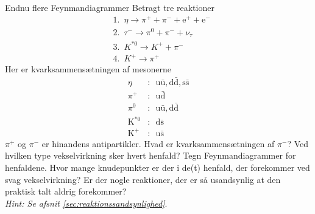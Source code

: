 \begin{opgave}{Endnu flere Feynmandiagrammer}
    Betragt tre reaktioner
    \begin{align*}
        &1. \enspace \eta \rightarrow \pi^+ + \pi^- + \mathrm{e}^+ + \mathrm{e}^- \\
        &2. \enspace \tau^- \rightarrow \pi^0 + \pi^- + \nu_\tau \\
        &3. \enspace K^{*0} \rightarrow K^+ + \pi^- \\
        &4. \enspace K^+ \rightarrow \pi^+
    \end{align*}
    Her er kvarksammensætningen af mesonerne
    \begin{align*}
        \eta&: \enspace \mathrm u \bar{\mathrm u}, \mathrm d \bar{\mathrm d}, \mathrm s \bar{\mathrm s} \\
        \pi^+&: \enspace \mathrm u \bar{\mathrm d} \\
        \pi^0&: \enspace \mathrm u \bar{\mathrm u}, \mathrm d \bar{\mathrm d} \\
        \mathrm K^{*0}&: \enspace \mathrm d \bar{\mathrm{s}} \\
        \mathrm K^+&: \enspace \mathrm u \bar{\mathrm{s}}
        \end{align*}
    \opg $\pi^+$ og $\pi^-$ er hinandens antipartikler. Hvad er kvarksammensætningen af $\pi^-$?
    \opg Ved hvilken type vekselvirkning sker hvert henfald?
    \opg Tegn Feynmandiagrammer for henfaldene.
    \opg Hvor mange knudepunkter er der i de(t) henfald, der forekommer ved svag vekselvirkning?
    \opg Er der nogle reaktioner, der er så usandsynlig at den praktisk talt aldrig forekommer? \\
    \textit{Hint: Se afsnit \ref{sec:reaktionssandsynlighed}}.
\end{opgave}

